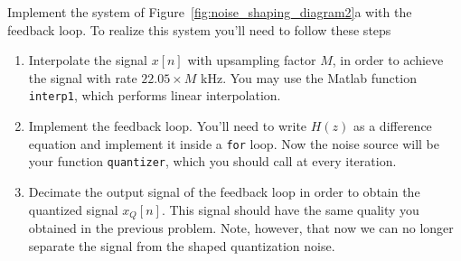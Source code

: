 \documentclass[12pt]{report}
\begin{document}
\newpage
{}

Implement the system of Figure~\ref{fig:noise_shaping_diagram2}a with the feedback loop. To realize this system you'll need to follow these steps
\begin{enumerate}
	\item Interpolate the signal $x[n]$ with upsampling factor $M$, in order to achieve the signal with rate $22.05\times M$ kHz. You may use the Matlab function \texttt{interp1}, which performs linear interpolation. 
	\item Implement the feedback loop. You'll need to write $H(z)$ as a difference equation and implement it inside a \texttt{for} loop. Now the noise source will be your function \texttt{quantizer}, which you should call at every iteration.
	\item Decimate the output signal of the feedback loop in order to obtain the quantized signal $x_Q[n]$. This signal should have the same quality you obtained in the previous problem. Note, however, that now we can no longer separate the signal from the shaped quantization noise.
\end{enumerate}


\newpage

\begin{center}
\end{center}
\\




\end{document}
